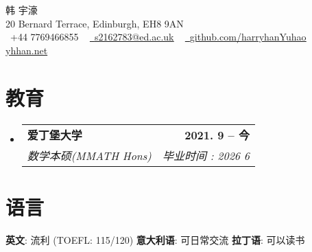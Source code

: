 \documentclass[letterpaper,11pt]{ctexart}
\makeatletter
\newcommand{\resumeSubheading}[4]{
  \vspace{-2pt}\item
    \begin{tabular*}{1.0\textwidth}[t]{l@{\extracolsep{\fill}}r}
      \textbf{#1} & \textbf{\small #2} \\
      \textit{\small#3} & \textit{\small #4} \\
    \end{tabular*}\vspace{-7pt}
}
\newcommand{\resumeSubHeadingListStart}{\begin{itemize}[leftmargin=0.0in, label={}]}
\newcommand{\resumeSubHeadingListEnd}{\end{itemize}}
\makeatother
\begin{document}

\begin{center}
    {\Huge \scshape 韩 宇濠} \\ \vspace{1pt}
	20 Bernard Terrace, Edinburgh, EH8 9AN
    \\ \vspace{1pt}
    \small \raisebox{-0.1\height}\faPhone\ +44 7769466855 ~ \href{mailto:s2162783@ed.ac.uk}{\raisebox{-0.2\height}\faEnvelope\  \underline{s2162783@ed.ac.uk}} ~ 
    \href{https://github.com/harryhanYuhao}{\raisebox{-0.2\height}\faGithub\ \underline{github.com/harryhanYuhao}} ~
    \href{https://yhhan.net}{\raisebox{-0.2\height}\faChain \underline{yhhan.net}} ~

    \vspace{-8pt}
\end{center}


\section{教育}
  \resumeSubHeadingListStart
    \resumeSubheading
      {爱丁堡大学}{2021. 9 -- 今}
      {数学本硕(MMATH Hons)}{毕业时间 : 2026 6}
  \resumeSubHeadingListEnd

\section{语言}
\begin{multicols}{2}
        \textbf{英文}: 流利 (TOEFL: 115/120) \hfill
        \textbf{意大利语}: 可日常交流 \hfill
        \textbf{拉丁语}: 可以读书 \hfill
 \end{multicols}
\end{document}
